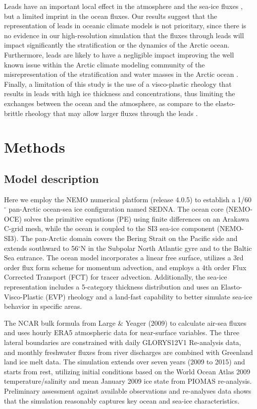 \documentclass[lineno,sn-basic]{sn-jnl}%
\begin{document}
Leads have an important local effect in the atmosphere and the sea-ice fluxes \citep{Lupkes_leads_2008,Marcq_flux_lead_2012, Wettlaufer_insulator_1997, Smith_polynyas_1990}, but a limited imprint in the ocean fluxes. Our results suggest that the representation of leads in oceanic climate models is not prioritary, since there is no evidence in our high-resolution simulation that the fluxes through leads will impact significantly the stratification or the dynamics of the Arctic ocean.
Furthermore, leads are likely to have a negligible impact improving the well known issue within the Arctic climate modeling community of the misrepresentation of the stratification and water masses in the Arctic ocean \citep{Wang_ompi_2024,Ilicak_core_2016}. Finally, a limitation of this study is the use of a visco-plastic rheology that results in leads with high ice thickness and concentrations, thus limiting the exchanges between the ocean and the atmosphere, as compare to the elasto-brittle rheology that may allow larger fluxes through the leads \citep{Rampal_nextsim_2016,Olason_lead_2021}. 


\section{Methods}
\subsection*{Model description}

Here we employ the NEMO numerical platform (release 4.0.5) to establish a 1/60$^\circ$ pan-Arctic ocean-sea ice configuration named SEDNA. The ocean core (NEMO-OCE) solves the primitive equations (PE) using finite differences on an Arakawa C-grid mesh, while the ocean is coupled to the SI3 sea-ice component (NEMO-SI3). The pan-Arctic domain covers the Bering Strait on the Pacific side and extends southward to 56$^\circ$N in the Subpolar North Atlantic gyre and to the Baltic Sea entrance. The ocean model incorporates a linear free surface, utilizes a 3rd order flux form scheme for momentum advection, and employs a 4th order Flux Corrected Transport (FCT) for tracer advection. Additionally, the sea-ice representation includes a 5-category thickness distribution and uses an Elasto-Visco-Plastic (EVP) rheology and a land-fast capability to better simulate sea-ice behavior in specific areas.

The NCAR bulk formula from Large \& Yeager (2009) to calculate air-sea fluxes and uses hourly ERA5 atmospheric data for near-surface variables. The three lateral boundaries are constrained with daily GLORYS12V1 Re-analysis data, and monthly freshwater fluxes from river discharges are combined with Greenland land ice melt data. The simulation extends over seven years (2009 to 2015) and starts from rest, utilizing initial conditions based on the World Ocean Atlas 2009 temperature/salinity and mean January 2009 ice state from PIOMAS re-analysis. Preliminary assessment against available observations and re-analyses data shows that the simulation reasonably captures key ocean and sea-ice characteristics.
\end{document}
